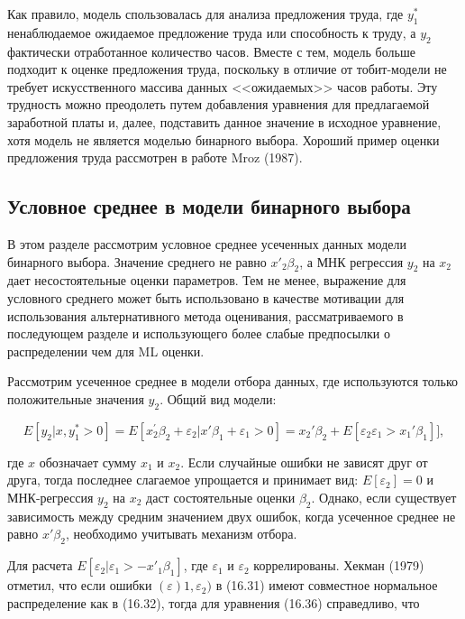 Как правило, модель спользовалась для анализа предложения труда, где $y^{*}_1$ ненаблюдаемое ожидаемое предложение труда или способность к труду, а $y_2$ фактически отработанное количество часов. Вместе с тем, модель больше подходит к оценке предложения труда, поскольку в отличие от тобит-модели не требует искусственного массива данных <<ожидаемых>> часов работы. 
Эту трудность можно преодолеть путем добавления уравнения для предлагаемой заработной платы и, далее, подставить данное значение в исходное уравнение, хотя модель не является моделью бинарного выбора. Хороший пример оценки предложения труда рассмотрен в работе Mroz (1987).

\subsection{Условное среднее в модели бинарного выбора}

В этом разделе рассмотрим условное среднее усеченных данных модели бинарного выбора. Значение среднего не равно $x'_{2}\beta_2$, а МНК регрессия $y_2$ на $x_2$ дает несостоятельные оценки параметров. Тем не менее, выражение для условного среднего может быть использовано в качестве мотивации для использования альтернативного метода оценивания, рассматриваемого в последующем разделе и использующего более слабые предпосылки о распределении чем для ML оценки. 

Рассмотрим усеченное среднее в модели отбора данных, где используются только положительные значения $y_2$. Общий вид модели:

\begin{equation}
E[y_2|x,y_1^{\ast}>0]=E[x_2^{\prime}\beta_2+\varepsilon_2|x'\beta_1+\varepsilon_1>0] = x_2'\beta_2+E[\varepsilon_2\varepsilon_1>x_1'\beta_1]],
\end{equation}

где $x$ обозначает сумму $x_1$ и $x_2$. Если случайные ошибки не зависят друг от друга, тогда последнее слагаемое упрощается и принимает вид: $E[\varepsilon_2]=0$ и МНК-регрессия $y_2$ на $x_2$ даст состоятельные оценки $\beta_2$. Однако, если существует зависимость между средним значением двух ошибок, когда усеченное среднее не равно $x'\beta_2$, необходимо учитывать механизм отбора. 

Для расчета $E[\varepsilon_2|\varepsilon_1>-{x'}_1\beta_1]$, где $\varepsilon_1$ и $\varepsilon_2$ коррелированы. Хекман (1979) отметил, что если ошибки $(\varepsilon)1,\varepsilon_2)$ в (16.31) имеют совместное нормальное распределение как в (16.32), тогда для уравнения (16.36) справедливо, что 

